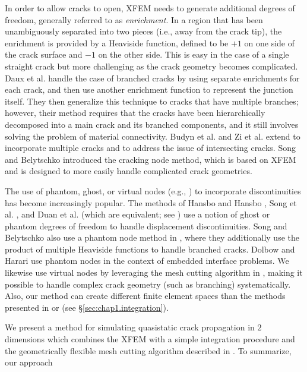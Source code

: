In order to allow cracks to open, XFEM needs to generate additional degrees of freedom, generally referred to as \emph{enrichment}. In a region that has been unambiguously separated into two pieces (i.e., away from the crack tip), the enrichment is provided by a Heaviside function, defined to be $+1$ on one side of the crack surface and $-1$ on the other side. This is easy in the case of a single straight crack but more challenging as the crack geometry becomes complicated. Daux et al. \cite{Daux00} handle the case of branched cracks by using separate enrichments for each crack, and then use another enrichment function to represent the junction itself. They then generalize this technique to cracks that have multiple branches; however, their method requires that the cracks have been hierarchically decomposed into a main crack and its branched components, and it still involves solving the problem of material connectivity. Budyn et al. \cite{Budyn04} and Zi et al. \cite{Zi.G04} extend \cite{Daux00} to incorporate multiple cracks and to address the issue of intersecting cracks. Song and Belytschko \cite{Song09a} introduced the cracking node method, which is based on XFEM and is designed to more easily handle complicated crack geometries.

The use of phantom, ghost, or virtual nodes (e.g., \cite{Molino05}) to incorporate discontinuities has become increasingly popular. The methods of Hansbo and Hansbo \cite{Hansbo04}, Song et al. \cite{Song06}, and Duan et al. \cite{Duan09} (which are equivalent; see \cite{Areias06}) use a notion of ghost or phantom degrees of freedom to handle displacement discontinuities. Song and Belytschko also use a phantom node method in \cite{Song09b}, where they additionally use the product of multiple Heaviside functions to handle branched cracks. Dolbow and Harari \cite{Dolbow09} use phantom nodes in the context of embedded interface problems. We likewise use virtual nodes by leveraging the mesh cutting algorithm in \cite{Sifakis07}, making it possible to handle complex crack geometry (such as branching) systematically. Also, our method can create different finite element spaces than the methods presented in \cite{Hansbo04} or \cite{Song06} (see \S\ref{sec:chap1.integration}).

We present a method for simulating quasistatic crack propagation in $2$ dimensions which combines the XFEM with a simple integration procedure and the geometrically flexible mesh cutting algorithm described in \cite{Sifakis07}. To summarize, our approach

